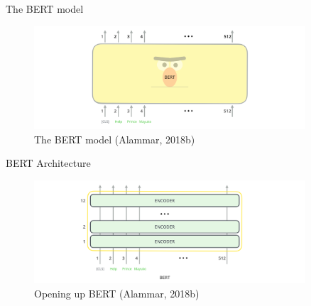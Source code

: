 \documentclass[10pt]{beamer}
\begin{document}
\begin{frame}{The BERT model}

\begin{figure}[h]
\centering
\includegraphics[width=0.9\textwidth]{fig/bert-input-output.png}
\caption{The BERT model (Alammar, 2018b)}
\end{figure}

\end{frame}


\begin{frame}{BERT Architecture}

\begin{figure}[h]
\centering
\includegraphics[width=0.9\textwidth]{fig/bert-encoders-input.png}
\caption{Opening up BERT (Alammar, 2018b)}
\end{figure}

\end{frame}



\end{document}
